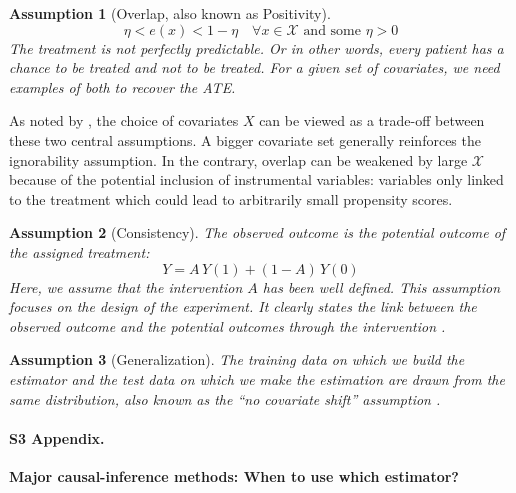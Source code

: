 \documentclass[10pt,letterpaper]{article}
\newtheorem{assumption}{Assumption}
\providecommand{\DIFaddbegin}{} %
\providecommand{\DIFaddend}{} %
\newcommand{\DIFaddincludegraphics}[2][]{{\color{blue}\fbox{\DIFOincludegraphics[#1]{#2}}}} %
\DeclareRobustCommand{\DIFaddbegin}{\DIFOaddbegin \let\includegraphics\DIFaddincludegraphics} %
\DeclareRobustCommand{\DIFaddend}{\DIFOaddend \let\includegraphics\DIFOincludegraphics} %
\begin{document}
\begin{assumption}[Overlap, also known as Positivity]\label{assumption:overlap}
  \begin{equation}\label{eq:overlap}
    \eta < e(x) < 1 - \eta \quad \forall x \in \mathcal{X} \text{ and some }   \eta > 0
  \end{equation}
  The treatment is not perfectly predictable. Or in other words, every
  patient has a chance to be treated and not to be treated. For a given set of
  covariates, we need examples of both to recover the ATE.
\end{assumption}

As noted by \cite{damour2020overlap}, the choice of covariates $X$ can
be viewed as a trade-off between these two central assumptions. A bigger
covariate set generally reinforces the ignorability assumption. In the
contrary, overlap can be weakened by large $\mathcal{X}$ because of the
potential inclusion of instrumental variables: variables only linked to the treatment which
could lead to arbitrarily small propensity scores.


\begin{assumption}[Consistency]\label{assumption:consistency} The observed
  outcome is the potential outcome of the assigned treatment:
  \begin{equation}\label{eq:consistancy}
    Y = A \, Y(1) + (1-A) \, Y(0)
  \end{equation}
  Here, we assume that the intervention $A$ has been well defined. This
  assumption focuses on the design of the experiment. It clearly states the link
  between the observed outcome and the potential outcomes through the
  intervention \cite{hernan2020causal}.
\end{assumption}

\begin{assumption}[Generalization]\label{assumption:generalization} The training
  data on which we build the estimator and the test data on which we make the
  estimation are drawn from the same distribution, also known as
  the ``no covariate shift'' assumption \cite{jesson2020identifying}.
\end{assumption}
\DIFaddbegin \clearpage
\DIFaddend



\paragraph*{S3 Appendix.}
\label{apd:causal_estimators}
{\bf Major causal-inference methods: When to use which estimator?}
\end{document}

